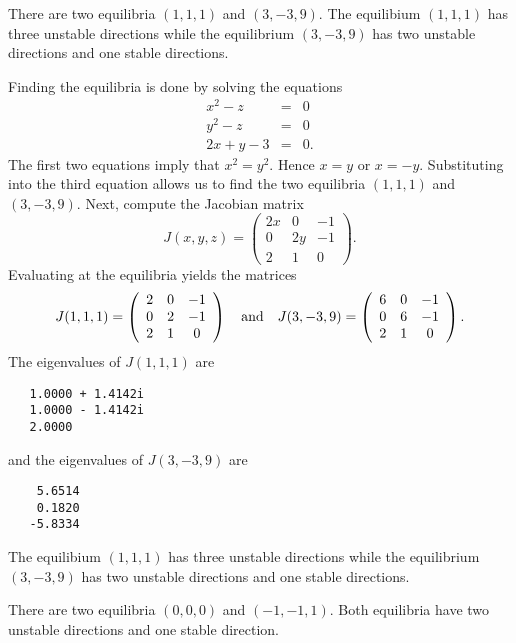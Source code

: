 \documentclass{ximera}
\begin{document}
 \ans There are two equilibria $(1,1,1)$ and $(3,-3,9)$.
The equilibium $(1,1,1)$ has three unstable directions while the
equilibrium $(3,-3,9)$ has two unstable directions and one stable directions.

\soln  Finding the equilibria is done by solving the equations
\begin{eqnarray*}
x^2-z & = & 0 \\
y^2-z & = & 0 \\
2x+y-3 & = & 0.
\end{eqnarray*}
The first two equations imply that $x^2=y^2$.  Hence $x=y$ or $x=-y$. 
Substituting into the third equation allows us to find the two equilibria
$(1,1,1)$ and $(3,-3,9)$.  Next, compute the Jacobian matrix
\[
J(x,y,z) = \left(\begin{array}{ccc}
2x & 0 & -1\\ 0 & 2y & -1\\ 2 & 1 & 0 \end{array}\right).
\]
Evaluating at the equilibria yields the matrices
\[
J(1,1,1) = \left(\begin{array}{ccc}
2 & 0 & -1\\ 0 & 2 & -1\\ 2 & 1 & 0 \end{array}\right)
\quad\mbox{and}\quad 
J(3,-3,9) = \left(\begin{array}{ccc}
6 & 0 & -1\\ 0 & 6 & -1\\ 2 & 1 & 0 \end{array}\right).
\]
The eigenvalues of $J(1,1,1)$ are
\begin{verbatim}
   1.0000 + 1.4142i
   1.0000 - 1.4142i
   2.0000     
\end{verbatim}
and the eigenvalues of $J(3,-3,9)$ are
\begin{verbatim}
    5.6514
    0.1820
   -5.8334
\end{verbatim}
The equilibium $(1,1,1)$ has three unstable directions while the
equilibrium $(3,-3,9)$ has two unstable directions and one stable 
directions.




  \ans There are two equilibria $(0,0,0)$ and $(-1,-1,1)$.
Both equilibria have two unstable directions and one stable direction.
\end{document}
